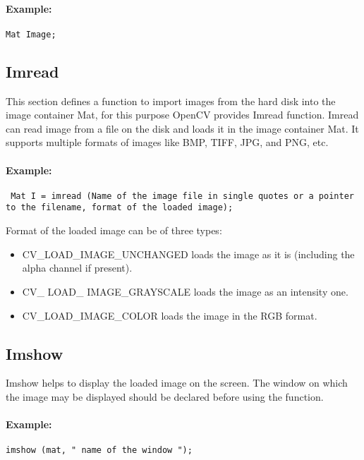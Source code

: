 \paragraph{Example:} 
\begin{lstlisting}
Mat Image;
\end{lstlisting}
\subsection{Imread}
\label{sec:Imread}
 This section defines a function to import images from the hard disk into the image container Mat, for this purpose OpenCV provides Imread function. Imread can read image from a file on the disk and loads it in the image container Mat. It supports multiple formats of images like BMP, TIFF, JPG, and PNG, etc. 
\paragraph{Example:}
\begin{lstlisting}
 Mat I = imread (Name of the image file in single quotes or a pointer to the filename, format of the loaded image);
\end{lstlisting}
\begin{flushleft}
Format of the loaded image can be of three types:
\begin{itemize}
\item CV\_LOAD\_IMAGE\_UNCHANGED  \-  loads the image as it is (including the alpha channel if present).

\item CV\_ LOAD\_ IMAGE\_GRAYSCALE \- loads the image as an intensity one.

\item CV\_LOAD\_IMAGE\_COLOR       \- loads the image in the RGB format.
\end{itemize}
\end{flushleft}
\subsection{Imshow}
\label{sec:Imshow}
Imshow helps to display the loaded image on the screen. The window on which the image may be displayed should be declared before using the function.
\paragraph{Example:}
\begin{lstlisting}
imshow (mat, " name of the window ");
\end{lstlisting}
